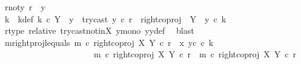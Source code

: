 \begin{isabellebody}
\ r{\isacharunderscore}{\kern0pt}not{\isacharunderscore}{\kern0pt}y{}{\isacharcolon}{\kern0pt}\ {\isachardoublequoteopen}r\ {\isasymnoteq}\ y{}{\isachardoublequoteclose}\isanewline
\ \ \ \ \ \ \ \ \isamarkupfalse%
\ \isamarkupfalse%
\ k\ \ k{\isacharunderscore}{\kern0pt}def{\isacharcolon}{\kern0pt}\ {\isachardoublequoteopen}k\ {\isasymin}\isactrlsub c\ Y\ {\isasymsetminus}\ {\isacharparenleft}{\kern0pt}{\isasymone}{\isacharcomma}{\kern0pt}y{}{\isacharparenright}{\kern0pt}\ {\isasymand}\ try{\isacharunderscore}{\kern0pt}cast\ y{}\ {\isasymcirc}\isactrlsub c\ r\ {\isacharequal}{\kern0pt}\ right{\isacharunderscore}{\kern0pt}coproj\ {\isasymone}\ {\isacharparenleft}{\kern0pt}Y\ {\isasymsetminus}\ {\isacharparenleft}{\kern0pt}{\isasymone}{\isacharcomma}{\kern0pt}y{}{\isacharparenright}{\kern0pt}{\isacharparenright}{\kern0pt}\ {\isasymcirc}\isactrlsub c\ k{\isachardoublequoteclose}\isanewline
\ \ \ \ \ \ \ \ \ \ \isamarkupfalse%
\ r{\isacharunderscore}{\kern0pt}type\ relative\ try{\isacharunderscore}{\kern0pt}cast{\isacharunderscore}{\kern0pt}not{\isacharunderscore}{\kern0pt}in{\isacharunderscore}{\kern0pt}X\ y{}{\isacharunderscore}{\kern0pt}mono\ y{}y{}{\isacharunderscore}{\kern0pt}def{\isacharparenleft}{\kern0pt}{}{\isacharparenright}{\kern0pt}\ \isamarkupfalse%
\ blast\isanewline
\ \ \ \ \ \ \ \ \isamarkupfalse%
\ m{\isacharunderscore}{\kern0pt}rightproj{\isacharunderscore}{\kern0pt}l{\isacharunderscore}{\kern0pt}equals{\isacharcolon}{\kern0pt}\ {\isachardoublequoteopen}m\ {\isasymcirc}\isactrlsub c\ right{\isacharunderscore}{\kern0pt}coproj\ X\ Y\ {\isasymcirc}\isactrlsub c\ r\ {\isacharequal}{\kern0pt}\ {\isasymlangle}x{}{\isacharcomma}{\kern0pt}\ y{}\isactrlsup c\ {\isasymcirc}\isactrlsub c\ k{\isasymrangle}{\isachardoublequoteclose}\isanewline
\ \ \ \ \ \ \ \ \ \ \ \ \ \isanewline
\ \ \ \ \ \ \ \ \isamarkupfalse%
\ {\isacharminus}{\kern0pt}\isanewline
\ \ \ \ \ \ \ \ \ \ \isamarkupfalse%
\ {\isachardoublequoteopen}m\ {\isasymcirc}\isactrlsub c\ right{\isacharunderscore}{\kern0pt}coproj\ X\ Y\ {\isasymcirc}\isactrlsub c\ r\ {\isacharequal}{\kern0pt}\ {\isacharparenleft}{\kern0pt}m\ {\isasymcirc}\isactrlsub c\ right{\isacharunderscore}{\kern0pt}coproj\ X\ Y{\isacharparenright}{\kern0pt}\ {\isasymcirc}\isactrlsub c\ r{\isachardoublequoteclose}\isanewline
\ \ \ \ \ \ \ \ \ \ \ \ \isamarkupfalse%

\end{isabellebody}
